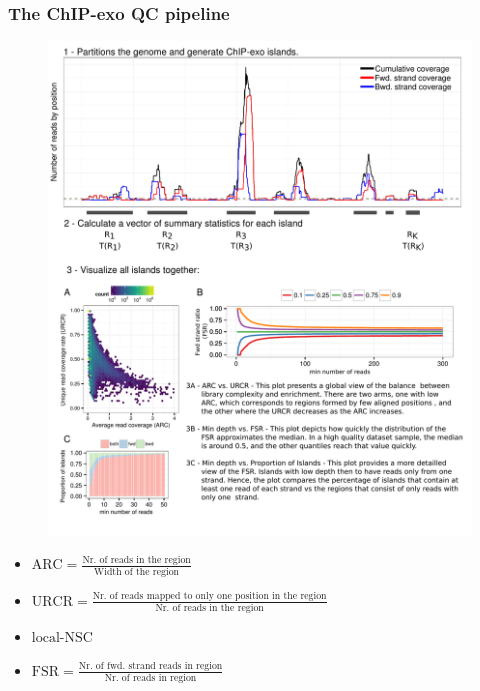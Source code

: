 \documentclass[compress,table,xcolor=dvipsnames]{beamer}\usepackage[]{graphicx}\usepackage[]{color}
\begin{document}
\begin{frame}[plain]
  \frametitle{The ChIP-exo QC pipeline}

\begin{figure}[H]
  \centering
  \includegraphics[width = \textwidth]{../figs/for_paper/coverage_diagram2.pdf}
\end{figure}

{\small
  \begin{itemize}
  \item $\mbox{ARC} = \frac{\text{Nr. of reads in the
        region}}{\text{Width of the region}}$
  \item $\mbox{URCR} = \frac{\text{Nr. of reads mapped to only one
        position in the region}}{\text{Nr. of reads in the region}}$
  \item $\mbox{local-NSC}$
  \item $\mbox{FSR} = \frac{\text{Nr. of fwd. strand reads in region}}{\text{Nr. of reads in region}}$
  \end{itemize}  
}

\end{frame}
\end{document}
